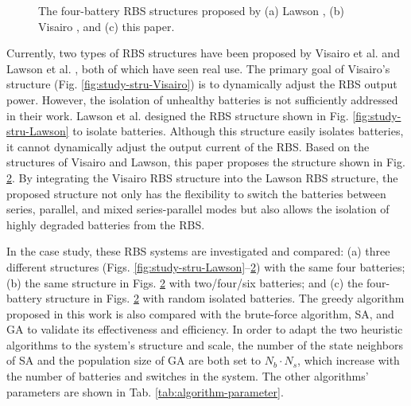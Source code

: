 \documentclass{article}
\begin{document}
\begin{figure}[htbp]
\begin{subfigure}[b]{0.31\textwidth}
        \caption{}
        \label{fig:study-stru-my}
    \end{subfigure}
    \caption{The four-battery RBS structures proposed by (a) Lawson \cite{lawsonSoftwareConfigurableBattery2012}, (b) Visairo \cite{visairoReconfigurableBatteryPack2008}, and (c) this paper.}
\end{figure}

Currently, two types of RBS structures have been proposed by Visairo et al. \cite{visairoReconfigurableBatteryPack2008} and Lawson et al. \cite{lawsonSoftwareConfigurableBattery2012}, both of which have seen real use. 
The primary goal of Visairo's structure (Fig. \ref{fig:study-stru-Visairo}) is to dynamically adjust the RBS output power. However, the isolation of unhealthy batteries is not sufficiently addressed in their work. 
Lawson et al. designed the RBS structure shown in Fig. \ref{fig:study-stru-Lawson} to isolate batteries. 
Although this structure easily isolates batteries, it cannot dynamically adjust the output current of the RBS. 
Based on the structures of Visairo and Lawson, this paper proposes the structure shown in Fig. \ref{fig:study-stru-my}.
By integrating the Visairo RBS structure into the Lawson RBS structure, the proposed structure not only has the flexibility to switch the batteries between series, parallel, and mixed series-parallel modes but also allows the isolation of highly degraded batteries from the RBS.


In the case study, these RBS systems are investigated and compared: (a) three different structures (Figs. \ref{fig:study-stru-Lawson}--\ref{fig:study-stru-my}) with the same four batteries; (b) the same structure in Figs. \ref{fig:study-stru-my} with two/four/six batteries; and (c) the four-battery structure in Figs. \ref{fig:study-stru-my} with random isolated batteries. 
The greedy algorithm proposed in this work is also compared with the brute-force algorithm, SA, and GA to validate its effectiveness and efficiency.
In order to adapt the two heuristic algorithms to the system's structure and scale, the number of the state neighbors of SA and the population size of GA are both set to $N_b \cdot N_s$, which increase with the number of batteries and switches in the system. 
The other algorithms' parameters are shown in Tab. \ref{tab:algorithm-parameter}.
\end{document}
